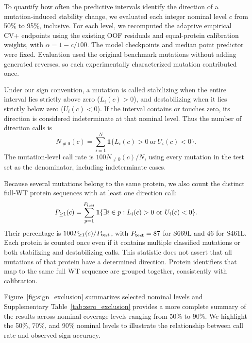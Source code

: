 \documentclass[11pt]{article}
\begin{document}
To quantify how often the predictive intervals identify the direction of  a mutation-induced stability change, we evaluated each integer nominal level $c$ from 50\% to 95\%, inclusive. For each level, we recomputed
the adaptive empirical CV+ endpoints using the existing OOF residuals and equal-protein calibration weights, with $\alpha=1-c/100$. The model checkpoints and median point predictor were fixed.
Evaluation used the original benchmark mutations without adding generated reverses, so each experimentally characterized mutation contributed once.

Under our sign convention, a mutation is called stabilizing when the entire interval lies strictly above zero ($L_i(c)>0$), and destabilizing when it lies strictly below zero ($U_i(c)<0$). If the interval contains or touches zero, its direction is considered indeterminate at that nominal level.
Thus the number of direction calls is
\begin{equation}
N_{\ne0}(c)=\sum_{i=1}^{N}\mathbf 1\{L_i(c)>0\ \text{or}\ U_i(c)<0\}.
\end{equation}
The mutation-level call rate is $100N_{\ne0}(c)/N$, using every mutation in the test set as the denominator, including indeterminate cases.

Because several mutations belong to the same protein, we also count the distinct full-WT protein sequences with at least one direction call:
\begin{equation}
P_{\ge1}(c)=\sum_{p=1}^{P_{\rm test}}\mathbf 1\{\exists i\in p:
L_i(c)>0\ \text{or}\ U_i(c)<0\}.
\end{equation}
Their percentage is $100P_{\ge1}(c)/P_{\rm test}$, with $P_{\rm test}=87$ for S669L and 46 for S461L. Each protein is counted once even if it contains multiple classified mutations or both stabilizing and destabilizing calls.
This statistic does not assert that all mutations of that protein have a determined direction. Protein identifiers that map to the same full WT sequence are grouped together, consistently with calibration.

Figure~\ref{fig:sign_exclusion} summarizes selected nominal levels and Supplementary Table~\ref{tab:zero_exclusion} provides a more complete summary of the results across nominal coverage levels ranging from 50\% to 90\%.
We highlight the 50\%, 70\%, and 90\% nominal levels to illustrate the relationship between call rate and observed sign accuracy.
\end{document}
